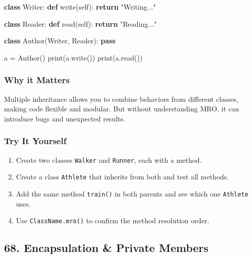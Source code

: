 \documentclass[
  letterpaper,
  DIV=11,
  numbers=noendperiod]{scrreprt}
\newenvironment{Shaded}{\begin{snugshade}}{\end{snugshade}}
\newcommand{\BuiltInTok}[1]{\textcolor[rgb]{0.00,0.23,0.31}{#1}}
\newcommand{\ControlFlowTok}[1]{\textcolor[rgb]{0.00,0.23,0.31}{\textbf{#1}}}
\newcommand{\KeywordTok}[1]{\textcolor[rgb]{0.00,0.23,0.31}{\textbf{#1}}}
\newcommand{\NormalTok}[1]{\textcolor[rgb]{0.00,0.23,0.31}{#1}}
\newcommand{\OperatorTok}[1]{\textcolor[rgb]{0.37,0.37,0.37}{#1}}
\newcommand{\StringTok}[1]{\textcolor[rgb]{0.13,0.47,0.30}{#1}}
\newcommand{\VariableTok}[1]{\textcolor[rgb]{0.07,0.07,0.07}{#1}}
\providecommand{\tightlist}{%
  \setlength{\itemsep}{0pt}\setlength{\parskip}{0pt}}
\begin{document}
\begin{Shaded}
\begin{Highlighting}[]
\KeywordTok{class}\NormalTok{ Writer:}
    \KeywordTok{def}\NormalTok{ write(}\VariableTok{self}\NormalTok{):}
        \ControlFlowTok{return} \StringTok{"Writing..."}

\KeywordTok{class}\NormalTok{ Reader:}
    \KeywordTok{def}\NormalTok{ read(}\VariableTok{self}\NormalTok{):}
        \ControlFlowTok{return} \StringTok{"Reading..."}

\KeywordTok{class}\NormalTok{ Author(Writer, Reader):}
    \ControlFlowTok{pass}

\NormalTok{a }\OperatorTok{=}\NormalTok{ Author()}
\BuiltInTok{print}\NormalTok{(a.write())}
\BuiltInTok{print}\NormalTok{(a.read())}
\end{Highlighting}
\end{Shaded}

\subsubsection{Why it Matters}\label{why-it-matters-66}

Multiple inheritance allows you to combine behaviors from different
classes, making code flexible and modular. But without understanding
MRO, it can introduce bugs and unexpected results.

\subsubsection{Try It Yourself}\label{try-it-yourself-66}

\begin{enumerate}
\def\labelenumi{\arabic{enumi}.}
\tightlist
\item
  Create two classes \texttt{Walker} and \texttt{Runner}, each with a
  method.
\item
  Create a class \texttt{Athlete} that inherits from both and test all
  methods.
\item
  Add the same method \texttt{train()} in both parents and see which one
  \texttt{Athlete} uses.
\item
  Use \texttt{ClassName.mro()} to confirm the method resolution order.
\end{enumerate}

\subsection{68. Encapsulation \& Private
Members}\label{encapsulation-private-members}
\end{document}
